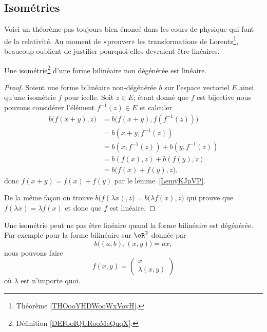 \subsection{Isométries}

Voici un théorème pas toujours bien énoncé dans les cours de physique qui font de la relativité. Au moment de «prouver» les transformations de Lorentz\footnote{Théorème \ref{THOooYHDWooWxVovH}.}, beaucoup oublient de justifier pourquoi elles devraient être linéaires.
\begin{theorem}     \label{ThoDsFErq}
	Une isométrie\footnote{Définition \ref{DEFooIQURooMeQuqX}.} d'une forme bilinéaire non dégénérée est linéaire.
\end{theorem}

\begin{proof}
	Soient une forme bilinéaire non-dégénérée \( b\) sur l'espace vectoriel \( E\) ainsi qu'une isométrie \( f\) pour icelle. Soit \( z\in E\); étant donné que \( f\) est bijective nous pouvons considérer l'élément \( f^{-1}(z)\in E\) et calculer
	\begin{subequations}
		\begin{align}
			b\big( f(x+y),z \big) & =b\big( f(x+y),f(f^{-1}(z)) \big) \\
			                      & =b(x+y,f^{-1}(z))                 \\
			                      & =b(x,f^{-1}(z))+b(y,f^{-1}(z))    \\
			                      & =b(f(x),z)+b(f(y),z)              \\
			                      & =b\big( f(x)+f(y),z \big),
		\end{align}
	\end{subequations}
	donc \( f(x+y)=f(x)+f(y)\) par le lemme~\ref{LemyKJpVP}.

	De la même façon on trouve \( b\big( f(\lambda x),z \big)=b\big( \lambda f(x),z \big)\) qui prouve que \( f(\lambda x)=\lambda f(x)\) et donc que \( f\) est linéaire.
\end{proof}

\begin{example}
	Une isométrie peut ne pas être linéaire quand la forme bilinéaire est dégénérée. Par exemple pour la forme bilinéaire sur \( \eR^2\) donnée par
	\begin{equation}
		b\big( (a,b),(x,y) \big)=ax,
	\end{equation}
	nous pouvons faire
	\begin{equation}
		f(x,y)=\begin{pmatrix}
			x \\
			\lambda(x,y)
		\end{pmatrix}
	\end{equation}
	où \( \lambda\) est n'importe quoi.
\end{example}

